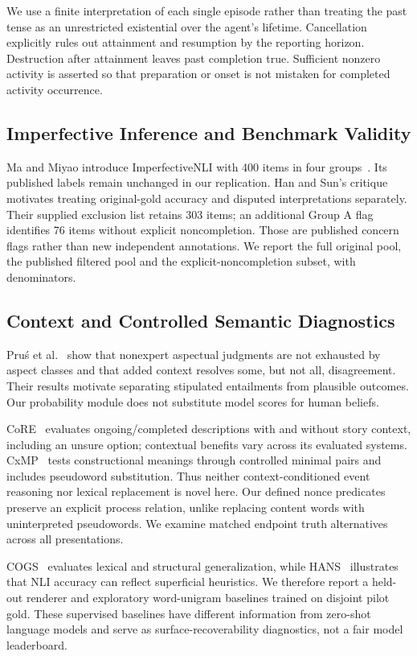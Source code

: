 \documentclass[sigconf,anonymous,review]{acmart}
\begin{document}
We use a finite interpretation of each single episode rather than treating the past tense as an unrestricted existential over the agent's lifetime. Cancellation explicitly rules out attainment and resumption by the reporting horizon. Destruction after attainment leaves past completion true. Sufficient nonzero activity is asserted so that preparation or onset is not mistaken for completed activity occurrence.

\subsection{Imperfective Inference and Benchmark Validity}
Ma and Miyao introduce ImperfectiveNLI with 400 items in four groups~\cite{ma2026}. Its published labels remain unchanged in our replication. Han and Sun's critique~\cite{han2026} motivates treating original-gold accuracy and disputed interpretations separately. Their supplied exclusion list retains 303 items; an additional Group A flag identifies 76 items without explicit noncompletion. Those are published concern flags rather than new independent annotations. We report the full original pool, the published filtered pool and the explicit-noncompletion subset, with denominators.

\subsection{Context and Controlled Semantic Diagnostics}
Pru\'{s} et al.~\cite{prus2024,prus2025} show that nonexpert aspectual judgments are not exhausted by aspect classes and that added context resolves some, but not all, disagreement. Their results motivate separating stipulated entailments from plausible outcomes. Our probability module does not substitute model scores for human beliefs.

CoRE~\cite{core2025} evaluates ongoing/completed descriptions with and without story context, including an unsure option; contextual benefits vary across its evaluated systems. CxMP~\cite{cxmp2026} tests constructional meanings through controlled minimal pairs and includes pseudoword substitution. Thus neither context-conditioned event reasoning nor lexical replacement is novel here. Our defined nonce predicates preserve an explicit process relation, unlike replacing content words with uninterpreted pseudowords. We examine matched endpoint truth alternatives across all presentations.

COGS~\cite{cogs2020} evaluates lexical and structural generalization, while HANS~\cite{hans2019} illustrates that NLI accuracy can reflect superficial heuristics. We therefore report a held-out renderer and exploratory word-unigram baselines trained on disjoint pilot gold. These supervised baselines have different information from zero-shot language models and serve as surface-recoverability diagnostics, not a fair model leaderboard.
\end{document}
